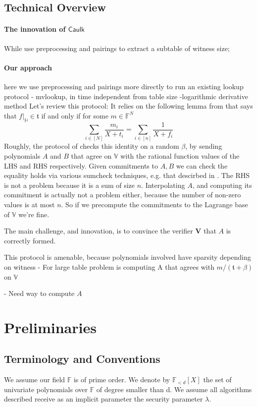 \documentclass[11pt]{article} %
\newcommand{\caulk}{\ensuremath{\mathsf{Caulk}}\xspace}
\newcommand{\F}{\ensuremath{\mathbb F}\xspace}
\newcommand{\ver}{\ensuremath{\mathsf{\mathbf{V}}}\xspace}
\newcommand{\polysofdeg}[1]{\ensuremath{\F_{< #1}[X]}\xspace}
\newcommand{\sumi}[1]{\sum_{i\in[#1]}}
\newcommand{\restricttoset}[2]{\ensuremath{#1|_{#2}}\xspace}
\newcommand{\subspace}{\ensuremath{\mathbb{H}}\xspace}
\newcommand{\bigspace}{\ensuremath{\mathbb{V}}\xspace}
\newcommand{\witsize}{\ensuremath{n}\xspace}
\newcommand{\tabsize}{\ensuremath{N}\xspace}
\newcommand{\tab}{\ensuremath{\mathfrak{t}}\xspace}
\begin{document}
\subsection{Technical Overview}
\paragraph{The innovation of \caulk }
While \cite{caulk,caulkp,flookup,baloo} use preprocessing and pairings to extract a subtable of witness size;


\paragraph{Our approach}
here we use preprocessing and pairings more directly to run an existing lookup protocol - mvlookup,
in time independent from table size
-logarithmic derivative method
Let's review this protocol:
It relies on the following lemma from \cite{mvlookup}
that says that $\restricttoset{f}{\subspace}\in \tab$ if and only if for some $m\in \F^\tabsize$
 \[\sumi{\tabsize}\frac{m_i}{X+t_i}=\sumi{\witsize}\frac{1}{X+f_i}\]
Roughly, the protocol of \cite{mvlookup} checks this identity on a random $\beta$,
by sending polynomials $A$ and $B$ that agree on \bigspace with the rational function values of the LHS and RHS
respectively.
Given commitments to $A,B$ we can check the equality holds via various sumcheck techniques, e.g. that descirbed in \cite{aurora}.
The RHS is not a problem because it is a sum of size \witsize.
Interpolating $A$, and computing its commitment is actually not a problem either, because the number of non-zero values
is at most \witsize. So if we precompute the commitments to the Lagrange base of  \bigspace we're fine.

The main challenge, and innovation, is to convince the verifier \ver that $A$ is correctly formed.


This protocol is amenable, because polynomials involved have sparsity depending on witness
- For large table problem is computing A that agrees with $m/(\tab+\beta)$ on \bigspace

- Need way to compute $A$ 
\section{Preliminaries}
\subsection{Terminology and Conventions}\label{sec:terminology}
We assume our field \F is of prime order.
We denote by \polysofdeg{d} the set of univariate polynomials over \F of degree smaller than d. 
We assume all algorithms described receive as an implicit parameter the security parameter $\lambda$.
\end{document}
